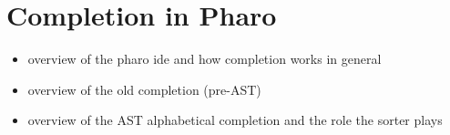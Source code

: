 \chapter{Completion in Pharo}
\label{chap:Completion in Pharo}

\begin{itemize}
    \item overview of the pharo ide and how completion works in general
    \item overview of the old completion (pre-AST)
    \item overview of the AST alphabetical completion and the role the sorter plays
\end{itemize}